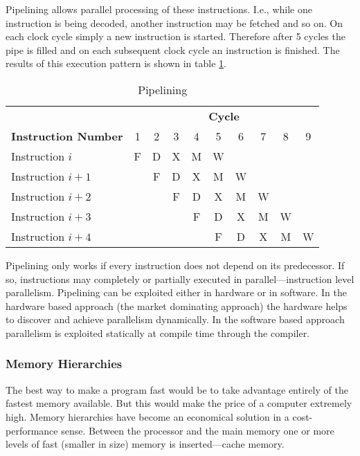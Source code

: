 Pipelining allows parallel processing of these
instructions. I.e., while one instruction is being decoded, another
instruction may be fetched and so on. On each clock cycle simply a new
instruction is started. Therefore after 5 cycles the pipe is filled
and on each subsequent clock cycle an instruction is finished. The
results of this execution pattern is shown in table
\ref{tab:pipelining}.

\begin{table}[h!b!p!]
\caption{Pipelining}
\centering
\begin{tabular}{|l|c|c|c|c|c|c|c|c|c|}
\hline
 & \multicolumn{9}{|c|}{\textbf{Cycle}} \\
\textbf{Instruction Number}
	& 1
	& 2
	& 3
	& 4
	& 5
	& 6
	& 7
	& 8
	& 9
        \\ \hline 
Instruction $i$   & F & D & X & M & W &   &   &   &   \\ \hline
Instruction $i+1$ &   & F & D & X & M & W &   &   &   \\ \hline
Instruction $i+2$ &   &   & F & D & X & M & W &   &   \\ \hline
Instruction $i+3$ &   &   &   & F & D & X & M & W &   \\ \hline
Instruction $i+4$ &   &   &   &   & F & D & X & M & W \\ \hline
\end{tabular}
\label{tab:pipelining}
\end{table}

Pipelining only works if every instruction does not depend on its
predecessor. If so, instructions may completely or partially executed
in parallel---instruction level parallelism.
Pipelining can be
exploited either in hardware or in software. In the hardware based
approach (the market dominating approach) the hardware helps to
discover and achieve parallelism dynamically. In the software based
approach parallelism is exploited statically at compile time through the
compiler. 

\subsubsection{Memory Hierarchies}

The best way to
make a program fast would be to take advantage entirely of the fastest memory
available. But this would make the price of a computer extremely
high. Memory hierarchies have become an economical solution in a
cost-performance sense. Between the processor and the main memory one
or more levels of fast (smaller in size) memory is inserted---cache
memory.

